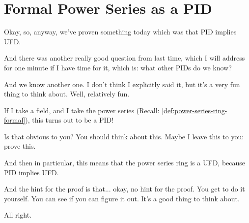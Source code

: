 \section{Formal Power Series as a PID}

\begin{speech}[01:28:56 - 01:30:05]
Okay, so, anyway, we've proven something today which was that PID implies UFD.

And there was another really good question from last time, which I will address for one minute if I have time for it, which is: what other PIDs do we know?

And we know another one. I don't think I explicitly said it, but it's a very fun thing to think about. Well, relatively fun.

If I take a field, and I take the power series (Recall: \cref{def:power-series-ring-formal}), this turns out to be a PID! 

Is that obvious to you? You should think about this. Maybe I leave this to you: prove this. 

And then in particular, this means that the power series ring is a UFD, because PID implies UFD. 

And the hint for the proof is that... okay, no hint for the proof. You get to do it yourself.  You can see if you can figure it out. It's a good thing to think about.

All right. 
\end{speech}

